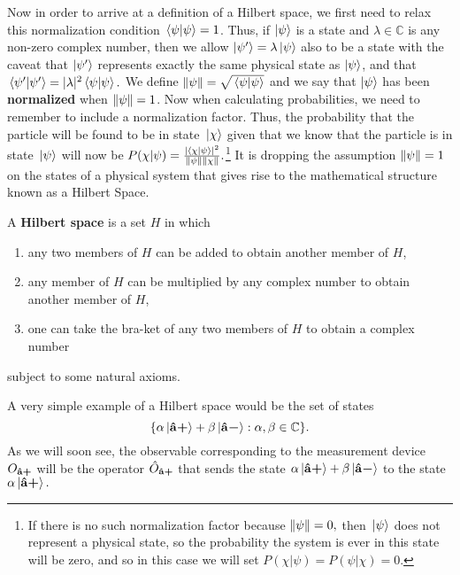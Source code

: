 Now in order to arrive at a definition of a Hilbert space, we first need to relax this normalization condition $\ip*{\psi}{\psi}=1$. Thus, if $\ket{\psi}$  is a state and $\lambda\in\mathbb{C}$ is any non-zero complex number, then we allow $\ket{\psi'}=\lambda\ket{\psi}$ also to be a state with the caveat that $\ket{\psi'}$ represents exactly the same physical state as $\ket{\psi}$, and that $\ip*{\psi'}{\psi'}=|\lambda|^2\ip*{\psi}{\psi}.$ We define $\norm{\psi}=\sqrt{\ip*{\psi}{\psi}}$ and we say that $\ket{\psi}$ has been \textbf{normalized} when $\norm{\psi}=1$. Now when calculating probabilities, we need to remember to include a normalization factor. Thus, the probability that the particle will be found to be in state $\ket*{\chi}$ given that we know that the particle is in state $\ket*{\psi}$ will now be $P(\chi|\psi) = \frac{|\ip*{\chi}{\psi}|^2}{\norm{\psi}\norm{\chi}}.$\footnote{ If there is no such normalization factor because $\norm{\psi}=0,$ then $\ket*{\psi}$ does not represent a physical state, so the probability the system is ever in this state will be zero, and so in this case we will set $P(\chi|\psi)=P(\psi|\chi)=0.$} It is  dropping the assumption $\norm{\psi}=1$ on the states of a physical system that gives rise to the mathematical structure known as a Hilbert Space.   

A \textbf{Hilbert space} is a set $H$ in which 
\begin{enumerate}[noitemsep, nosep, topsep=0pt]
\item any two members of $H$ can be added to obtain another member of $H$, 
\item any member of $H$ can be multiplied by any complex number to obtain another member of $H$,
\item one can take the bra-ket of any two members of $H$ to obtain a complex number\end{enumerate}
subject to some natural axioms.\footnotemark

A very simple example of a Hilbert space would be the set of states 
$$\{\alpha\ket*{\vb{\hat{{a}}}\bm{+}}+\beta\ket*{\vb{\hat{{a}}}\bm{-}}:\alpha,\beta\in\mathbb{C}\}.$$ 
As we will soon see, the observable corresponding to the measurement device $O_{\vb{\hat{{a}}}\bm{+}}$ will be the operator $\hat{O}_{\vb{\hat{{a}}}\bm{+}}$ that sends the state $\alpha\ket*{\vb{\hat{{a}}}\bm{+}}+\beta\ket*{\vb{\hat{{a}}}\bm{-}}$ to the state $\alpha\ket*{\vb{\hat{{a}}}\bm{+}}.$

